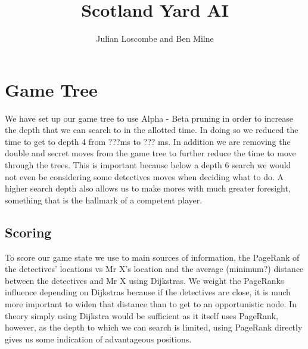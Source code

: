 \documentclass[a4paper, 12pt]{article}
\title{Scotland Yard AI}
\author{Julian Loscombe and Ben Milne}
\begin{document}
\maketitle
\section{Game Tree}
We have set up our game tree to use Alpha - Beta pruning in order to increase the depth that we can search to in the allotted time. In doing so we reduced the time to get to depth 4 from ???ms to ??? ms. In addition we are removing the double and secret moves from the game tree to further reduce the time to move through the trees. This is important because below a depth 6 search we would not even be considering some detectives moves when deciding what to do. A higher search depth also allows us to make mores with much greater foresight, something that is the hallmark of a competent player.
\subsection{Scoring}
To score our game state we use to main sources of information, the PageRank of the detectives' locations vs Mr X's location and the average (minimum?) distance between the detectives and Mr X using Dijkstras. We weight the PageRanks influence depending on Dijkstras because if the detectives are close, it is much more important to widen that distance than to get to an opportunistic node. In theory simply using Dijkstra would be sufficient as it itself uses PageRank, however, as the depth to which we can search is limited, using PageRank directly gives us some indication of advantageous positions.\\
\\
\begin{figure}[!h]
\centering
{}
\end{figure}
\end{document}
